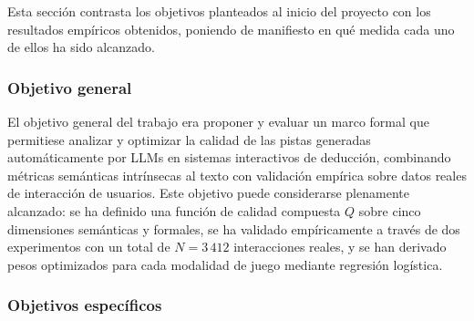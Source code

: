\documentclass[../main.tex]{subfiles}
\begin{document}
Esta sección contrasta los objetivos planteados al inicio del proyecto con los resultados empíricos obtenidos, poniendo de manifiesto en qué medida cada uno de ellos ha sido alcanzado.

\subsubsection{Objetivo general}

El objetivo general del trabajo era proponer y evaluar un marco formal que permitiese analizar y optimizar la calidad de las pistas generadas automáticamente por LLMs en sistemas interactivos de deducción, combinando métricas semánticas intrínsecas al texto con validación empírica sobre datos reales de interacción de usuarios. Este objetivo puede considerarse plenamente alcanzado: se ha definido una función de calidad compuesta $Q$ sobre cinco dimensiones semánticas y formales, se ha validado empíricamente a través de dos experimentos con un total de $N=3\,412$ interacciones reales, y se han derivado pesos optimizados para cada modalidad de juego mediante regresión logística.

\subsubsection{Objetivos específicos}
\end{document}
